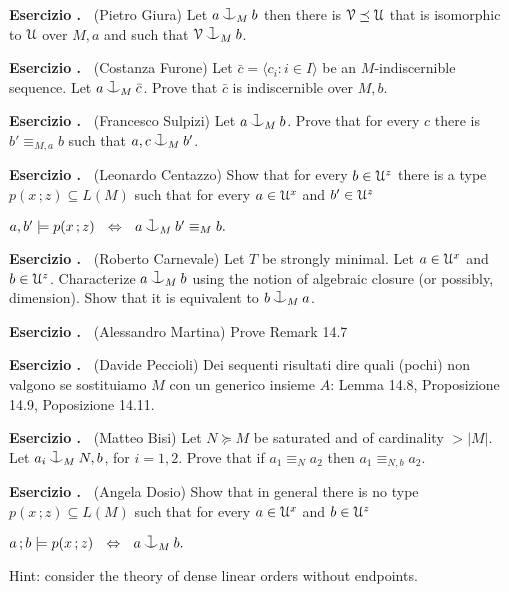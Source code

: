 \documentclass[10pt]{article}
\def\U{\EuScript U}
\def\V{\EuScript V}
\def\IFF{\Leftrightarrow}
\def\cnonfork{\mathbin{\raise1.8ex\rlap{\kern0.6ex\rule{0.6ex}{0.1ex}}\rlap{\kern1.1ex\rule{0.1ex}{1.9ex}}\raise-0.3ex\hbox{$\smile$} } }
\newcounter{ex}
\newenvironment{exercise}{\bigskip\addtocounter{ex}{1}\textbf{Esercizio \theex.\ }}{}
\begin{document}
\begin{exercise}
  (Pietro Giura)
  Let $a\cnonfork_M b$ then there is $\V\preceq\U$ that is isomorphic to $\U$ over $M,a$ and such that $\V\cnonfork_Mb$.
\end{exercise}

\begin{exercise} 
  (Costanza Furone)
  Let $\bar c=\langle c_i:i\in I\rangle$ be an $M$-indiscernible sequence.
  Let $a\cnonfork_M\bar c$.
  Prove that $\bar c$ is indiscernible over $M,b$.
\end{exercise}

\begin{exercise} 
  (Francesco Sulpizi)
  Let $a\cnonfork_M b$. 
  Prove that for every $c$ there is $b'\equiv_{M,a} b$ such that $a,c\cnonfork_M b'$. 
\end{exercise}

\begin{exercise}
  (Leonardo Centazzo)
  Show that for every $b\in\U^z$ there is a type $p(x\,;z)\subseteq L(M)$ such that for every  $a\in\U^x$ and $b'\in\U^z$ 
  
  \hfil$a,b'\models p(x\,;z)\ \ \IFF\ \ a\cnonfork_M b'\equiv_M b.$
\end{exercise}

\begin{exercise}
  (Roberto Carnevale)
  Let $T$ be strongly minimal.
  Let $a\in\U^x$ and $b\in\U^z$. 
  Characterize $a\cnonfork_M b$ using the notion of algebraic closure (or possibly, dimension).
  Show that it is equivalent to $b\cnonfork_M a$.
\end{exercise}

\begin{exercise}
  (Alessandro Martina)
  Prove Remark 14.7
\end{exercise}

\begin{exercise}
  (Davide Peccioli)
  Dei sequenti risultati dire quali (pochi) non valgono se sostituiamo $M$ con un generico insieme $A$: Lemma 14.8, Proposizione 14.9, Poposizione 14.11.
\end{exercise}

\begin{exercise}
  (Matteo Bisi) 
  Let $N\succeq M$ be saturated and of cardinality $>|M|$.
  Let $a_i\cnonfork_M N,b$, for $i=1,2$.
  Prove that if $a_1\equiv_N a_2$ then $a_1\equiv_{N,b} a_2$.
\end{exercise}

\begin{exercise}
  (Angela Dosio)
  Show that in general there is no type $p(x\,;z)\subseteq L(M)$ such that for every  $a\in\U^x$ and $b\in\U^z$\vspace*{-2ex}

  \hfil$a\,;b\models p(x\,;z)\ \ \IFF\ \ a\cnonfork_M b.$

  Hint: consider the theory of dense linear orders without endpoints.
\end{exercise}
  
\end{document}
